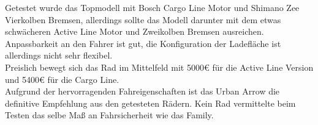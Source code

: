 \documentclass[a4paper,ngerman, 14pt] {scrartcl}
\begin{document}
\begin{itemize}
    Getestet wurde das Topmodell mit Bosch Cargo Line Motor und Shimano Zee Vierkolben Bremsen, allerdings sollte das Modell darunter mit dem etwas schwächeren Active Line Motor und Zweikolben Bremsen ausreichen. Anpassbarkeit an den Fahrer ist gut, die Konfiguration der Ladefläche ist allerdings nicht sehr flexibel.\\
    Preislich bewegt sich das Rad im Mittelfeld mit 5000€ für die Active Line Version und 5400€ für die Cargo Line.\\
    Aufgrund der hervorragenden Fahreigenschaften ist das Urban Arrow die definitive Empfehlung aus den getesteten Rädern. Kein Rad vermittelte beim Testen das selbe Maß an Fahrsicherheit wie das Family.
\end{itemize}
\end{document}
